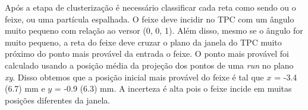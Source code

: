 \documentclass[a4paper,12pt,oneside]{book}
\begin{document}






\par Após a etapa de clusterização é necessário classificar cada reta como sendo ou o feixe, ou uma partícula espalhada. O feixe deve incidir no TPC com um ângulo muito pequeno com relação ao versor (0, 0, 1). Além disso, mesmo se o ângulo for muito pequeno, a reta do feixe deve cruzar o plano da janela do TPC muito próximo do ponto mais provável da entrada o feixe. O ponto mais provável foi calculado usando a posição média da projeção dos pontos de uma \textit{run} no plano \textit{xy}. Disso obtemos que a posição inicial mais provável do feixe é tal que $x$ = -3.4 (6.7) mm e $y$ = -0.9 (6.3) mm. A incerteza é alta pois o feixe incide em muitas posições diferentes da janela.
\end{document}
